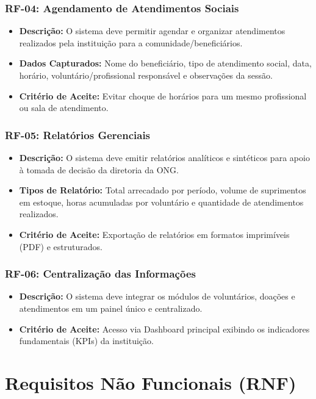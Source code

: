 \documentclass[
    12pt,               %
    a4paper,            %
    oneside,
    brazil              %
]{abntex2}
\begin{document}
\subsection{RF-04: Agendamento de Atendimentos Sociais}
\begin{itemize}
    \item \textbf{Descrição:} O sistema deve permitir agendar e organizar atendimentos realizados pela instituição para a comunidade/beneficiários.
    \item \textbf{Dados Capturados:} Nome do beneficiário, tipo de atendimento social, data, horário, voluntário/profissional responsável e observações da sessão.
    \item \textbf{Critério de Aceite:} Evitar choque de horários para um mesmo profissional ou sala de atendimento.
\end{itemize}

\subsection{RF-05: Relatórios Gerenciais}
\begin{itemize}
    \item \textbf{Descrição:} O sistema deve emitir relatórios analíticos e sintéticos para apoio à tomada de decisão da diretoria da ONG.
    \item \textbf{Tipos de Relatório:} Total arrecadado por período, volume de suprimentos em estoque, horas acumuladas por voluntário e quantidade de atendimentos realizados.
    \item \textbf{Critério de Aceite:} Exportação de relatórios em formatos imprimíveis (PDF) e estruturados.
\end{itemize}

\subsection{RF-06: Centralização das Informações}
\begin{itemize}
    \item \textbf{Descrição:} O sistema deve integrar os módulos de voluntários, doações e atendimentos em um painel único e centralizado.
    \item \textbf{Critério de Aceite:} Acesso via Dashboard principal exibindo os indicadores fundamentais (KPIs) da instituição.
\end{itemize}


\chapter{Requisitos Não Funcionais (RNF)}
\end{document}
